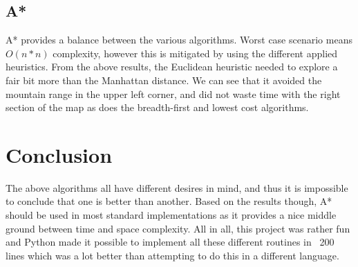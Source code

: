 \documentclass[11pt,letterpaper]{article}
\begin{document}
\subsection{A*}
A* provides a balance between the various algorithms.
Worst case scenario means $O(n*n)$ complexity, however this is mitigated by using the different applied heuristics.
From the above results, the Euclidean heuristic needed to explore a fair bit more than the Manhattan distance.
We can see that it avoided the mountain range in the upper left corner, and did not waste time with the right section of the map as does the breadth-first and lowest cost algorithms.

\section{Conclusion}
The above algorithms all have different desires in mind, and thus it is impossible to conclude that one is better than another.
Based on the results though, A* should be used in most standard implementations as it provides a nice middle ground between time and space complexity.
All in all, this project was rather fun and Python made it possible to implement all these different routines in ~200 lines which was a lot better than attempting to do this in a different language.

\clearpage

\end{document}
